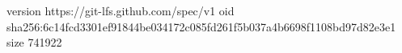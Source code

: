 version https://git-lfs.github.com/spec/v1
oid sha256:6c14fcd3301ef91844be034172c085fd261f5b037a4b6698f1108bd97d82e3e1
size 741922
